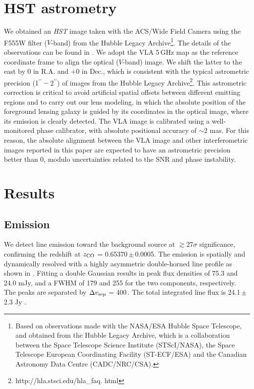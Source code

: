\documentclass[]{emulateapj}
\begin{document}
\section{HST astrometry} \label{sec:HST}
We obtained an {\it HST} image taken with
the ACS/Wide Field Camera 
using the F555W filter ($V$-band)
from the
Hubble Legacy Archive\footnote{Based on observations
made with the NASA/ESA Hubble Space Telescope, and obtained from the Hubble
Legacy Archive, which is a collaboration between the Space Telescope Science
Institute (STScI/NASA), the Space Telescope European Coordinating Facility
(ST-ECF/ESA) and the Canadian Astronomy Data Centre (CADC/NRC/CSA).}. 
The details of the observations can be found
in \citet[hereafter C06]{Claeskens06a}.
We adopt the VLA 5\,GHz map as the
reference coordinate frame to align the optical ($V$-band) image.
We shift the latter to the east by 0 in R.A. and $+$0 in
Dec., which is consistent with the typical astrometric precision (1$^{\prime\prime}-$2$^{\prime\prime}$) of
images from the Hubble Legacy Archive\footnote{http://hla.stsci.edu/hla\_faq.
html}. This astrometric correction is critical to avoid artificial spatial
offsets between different emitting regions and to carry out our lens modeling,
in which the absolute position of the foreground lensing galaxy is guided by its
coordinates in the optical image, where its emission is clearly detected.
The VLA image is calibrated using a well-monitored phase
calibrator, with absolute positional accuracy of $\sim$2 mas.
For this reason, the absolute alignment between the VLA image and other
interferometric images reported in this paper are expected to have an astrometric
precision better than 0, modulo uncertainties related to the SNR and phase
instability.

\section{Results} \label{sec:results}
\subsection{\bco Emission} \label{sec:CO21} %
We detect \bco line emission toward the background source
at $\gtrsim$27$\sigma$ significance, confirming the redshift at $z_{\rm CO}$ =
0.65370\,$\pm$\,0.0005. The emission is spatially and dynamically resolved
with a highly asymmetric double-horned line profile
as shown in . Fitting a double Gaussian results in peak
flux densities of 75.3 and 24.0 mJy, and a FWHM of
179 \kms and 255 \kms for the two components, respectively. The peaks are separated by
$\Delta v_{\rm sep}$ = 400\,\kms. The total integrated line flux is 24.1\,$\pm$\,2.3 Jy \kms. %
\end{document}

